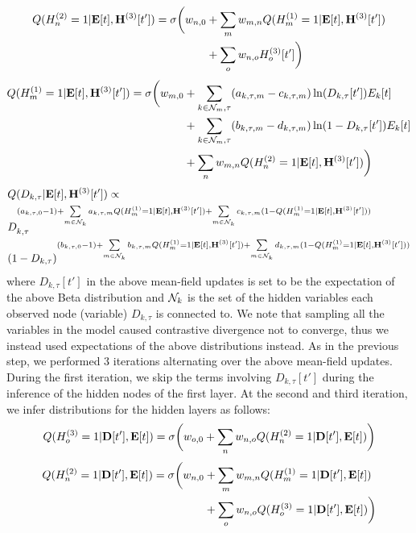 \begin{align*}
Q( H_n^{(2)} = 1 | \mathbf{E}[t], \mathbf{H}^{(3)}[t'] ) = \sigma \bigg( w_{n, 0} & + 
    \sum\limits_{m} w_{m, n} Q( H_m^{(1)} = 1 | \mathbf{E}[t], \mathbf{H}^{(3)}[t'] ) \\
& + \sum\limits_{o} w_{n, o} H_o^{(3)}[t'] \bigg)
\end{align*}
\begin{align*}
Q( H_m^{(1)} = 1 | \mathbf{E}[t], \mathbf{H}^{(3)}[t'] ) =
\sigma \bigg( w_{m, 0} & + \sum\limits_{k \in \mathcal{N}_m,\tau} (  a_{k,\tau,m} - c_{k,\tau,m} ) \ln(D_{k,\tau}[t']) E_k[t] \\
& + \sum\limits_{k \in \mathcal{N}_m,\tau} (  b_{k,\tau,m} - d_{k,\tau,m} ) \ln(1 - D_{k,\tau}[t']) E_k[t] \\
& + \sum\limits_{n} w_{m, n} Q( H_n^{(2)} = 1 | \mathbf{E}[t], \mathbf{H}^{(3)}[t'] ) \bigg)
\end{align*}
\begin{align*}
& Q( D_{k,\tau} | \mathbf{E}[t], \mathbf{H}^{(3)}[t'] ) \propto \\
& D_{k,\tau} ^{ (a_{k,\tau,0}-1) + \sum\limits_{m \in \mathcal{N}_k} a_{k,\tau,m} Q( H_m^{(1)} = 1 | \mathbf{E}[t], \mathbf{H}^{(3)}[t'] ) 
+ \sum\limits_{m \in \mathcal{N}_k} c_{k,\tau,m} (1-Q( H_m^{(1)} = 1 | \mathbf{E}[t], \mathbf{H}^{(3)}[t'] ))} \\
&  (1-D_{k,\tau}) ^{ (b_{k,\tau,0}-1) + \sum\limits_{m \in \mathcal{N}_k} b_{k,\tau,m} Q( H_m^{(1)} = 1 | \mathbf{E}[t], \mathbf{H}^{(3)}[t'] ) 
+ \sum\limits_{m \in \mathcal{N}_k} d_{k,\tau,m} (1-Q( H_m^{(1)} = 1 | \mathbf{E}[t], \mathbf{H}^{(3)}[t'] ))}
\end{align*}
where $D_{k,\tau}[t']$ in the above mean-field updates is set to be the expectation of the above Beta distribution and $\mathcal{N}_k$ is the set of the hidden variables each observed node (variable) $D_{k,\tau}$ is connected to. We note that sampling all the variables in the model caused contrastive divergence not to converge, thus we instead used expectations of the above distributions instead. As in the previous step, we performed $3$ iterations alternating over the above mean-field updates. During the first iteration, we skip the terms involving $D_{k,\tau}[t']$ during the inference of the hidden nodes of the first layer. At the second and third iteration, we infer distributions for the hidden layers as follows:
\begin{align*}
Q( H_o^{(3)} = 1 | \mathbf{D}[t'], \mathbf{E}[t] ) = \sigma \bigg( w_{o, 0} + \sum\limits_{n} w_{n, o} Q( H_n^{(2)} = 1 | \mathbf{D}[t'], \mathbf{E}[t] ) \bigg)
\end{align*}
\begin{align*}
Q( H_n^{(2)} = 1 | \mathbf{D}[t'], \mathbf{E}[t] ) = \sigma \bigg( w_{n, 0} & + 
    \sum\limits_{m} w_{m, n} Q( H_m^{(1)} = 1 | \mathbf{D}[t'], \mathbf{E}[t] ) \\
& + \sum\limits_{o} w_{n, o} Q( H_o^{(3)} = 1 | \mathbf{D}[t'], \mathbf{E}[t] ) \bigg)
\end{align*}
